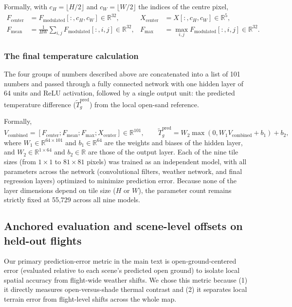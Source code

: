 \documentclass[12pt]{article}
\begin{document}
\noindent Formally, with $c_H = \lfloor H/2 \rfloor$ and $c_W = \lfloor W/2 \rfloor$ the indices of the centre pixel,
\begin{align}
F_{\text{center}} &= F_{\text{modulated}}[:, c_H, c_W] \in \mathbb{R}^{32}, &
X_{\text{center}} &= X[:, c_H, c_W] \in \mathbb{R}^{5}, \\
F_{\text{mean}} &= \frac{1}{HW} \sum_{i,j} F_{\text{modulated}}[:, i, j] \in \mathbb{R}^{32}, &
F_{\text{max}} &= \max_{i,j} F_{\text{modulated}}[:, i, j] \in \mathbb{R}^{32}.
\end{align}

\subsubsection{The final temperature calculation}
\noindent The four groups of numbers described above are concatenated into a list of 101 numbers and passed through a fully connected network with one hidden layer of 64 units and ReLU activation, followed by a single output unit: the predicted temperature difference ($\tilde{T}_g^{\text{pred}}$) from the local open-sand reference.

\noindent Formally,
\begin{equation}
V_{\text{combined}} = \left[ F_{\text{center}} ; F_{\text{mean}} ; F_{\text{max}} ; X_{\text{center}} \right] \in \mathbb{R}^{101}, \qquad
\tilde{T}_g^{\text{pred}} = W_2 \max\left(0, W_1 V_{\text{combined}} + b_1\right) + b_2,
\end{equation}
where $W_1 \in \mathbb{R}^{64 \times 101}$ and $b_1 \in \mathbb{R}^{64}$ are the weights and biases of the hidden layer, and $W_2 \in \mathbb{R}^{1 \times 64}$ and $b_2 \in \mathbb{R}$ are those of the output layer. Each of the nine tile sizes (from $1\times1$ to $81\times81$ pixels) was trained as an independent model, with all parameters across the network (convolutional filters, weather network, and final regression layers) optimized to minimize prediction error. Because none of the layer dimensions depend on tile size ($H$ or $W$), the parameter count remains strictly fixed at 55,729 across all nine models.


\subsection{Anchored evaluation and scene-level offsets on held-out flights}

\noindent Our primary prediction-error metric in the main text is open-ground-centered error (evaluated relative to each scene's predicted open ground) to isolate local spatial accuracy from flight-wide weather shifts. We chose this metric because (1) it directly measures open-versus-shade thermal contrast and (2) it separates local terrain error from flight-level shifts across the whole map.
\end{document}
